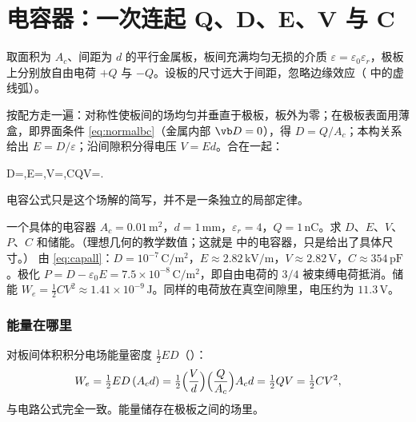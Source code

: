 
\section{电容器：一次连起 Q、D、E、V 与 C}\label{sec:systems-capacitor}

取面积为 $A_c$、间距为 $d$ 的平行金属板，板间充满均匀无损的介质 $\varepsilon=\varepsilon_0\varepsilon_r$，极板上分别放自由电荷 $+Q$ 与 $-Q$。设板的尺寸远大于间距，忽略边缘效应（ 中的虚线弧）。

按配方走一遍：对称性使板间的场均匀并垂直于极板，板外为零；在极板表面用薄盒，即界面条件 \eqref{eq:normalbc}（金属内部 $\vb D=0$），得 $D=Q/A_c$；本构关系给出 $E=D/\varepsilon$；沿间隙积分得电压 $V=Ed$。合在一起：
\begin{keyeq}
D=,\quad E=,\quad V=,\quad C\equiv\frac QV=.
\label{eq:capall}
\end{keyeq}
电容公式只是这个场解的简写，并不是一条独立的局部定律。

\begin{example}{一个具体的电容器}\label{ex:systems-cap}
$A_c=0.01\,\mathrm{m^2}$，$d=1\,\mathrm{mm}$，$\varepsilon_r=4$，$Q=1\,\mathrm{nC}$。求 $D$、$E$、$V$、$P$、$C$ 和储能。（理想几何的教学数值；这就是 中的电容器，只是给出了具体尺寸。）
\solution
由 \eqref{eq:capall}：$D=10^{-7}\,\mathrm{C/m^2}$，$E\approx2.82\,\mathrm{kV/m}$，$V\approx2.82\,\mathrm V$，$C\approx354\,\mathrm{pF}$。极化 $P=D-\varepsilon_0E=7.5\times10^{-8}\,\mathrm{C/m^2}$，即自由电荷的 $3/4$ 被束缚电荷抵消。储能 $W_e=\tfrac12CV^2\approx1.41\times10^{-9}\,\mathrm J$。同样的电荷放在真空间隙里，电压约为 $11.3\,\mathrm V$。
\end{example}

\subsubsection{能量在哪里} 对板间体积积分电场能量密度 $\tfrac12ED$（）：
\begin{equation}
W_e=\tfrac12ED\,(A_cd)=\tfrac12\Bigl(\frac Vd\Bigr)\Bigl(\frac{Q}{A_c}\Bigr)A_cd=\tfrac12QV=\tfrac12CV^2 ,
\end{equation}
与电路公式完全一致。能量储存在极板之间的场里。

